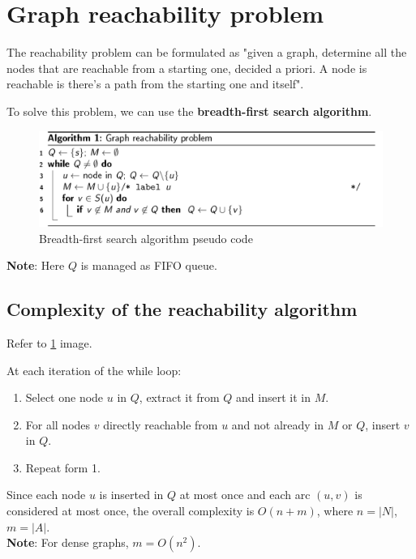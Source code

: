     \section{Graph reachability problem}
        The reachability problem can be formulated as "given a graph, determine all the nodes that are reachable from a starting one, decided a priori. A node is reachable is there's a path from the starting one and itself".
        
        To solve this problem, we can use the \textbf{breadth-first search algorithm}. 
        \begin{figure}[H]
        	\centering
        	\includegraphics[width = \textwidth]{./images/breadth-first-search.png}
            \caption{Breadth-first search algorithm pseudo code}
            \label{fig:breadthFirstSearchPseudoCode}
        \end{figure}
        \textbf{Note}: Here $Q$ is managed as FIFO queue.
        \subsection{Complexity of the reachability algorithm}
            Refer to \ref{fig:breadthFirstSearchPseudoCode} image.
            
            At each iteration of the while loop:
            \begin{enumerate}
                \item Select one node $u$ in $Q$, extract it from $Q$ and insert it in $M$.
                \item For all nodes $v$ directly reachable from $u$ and not already in $M$ or $Q$, insert $v$ in $Q$.
                \item Repeat form 1.
            \end{enumerate}
            
            Since each node $u$ is inserted in $Q$ at most once and each arc $(u, v)$ is considered at most once, the overall complexity is
            $O(n + m)$, where $n = |N|$, $m = |A|$.\\
            \textbf{Note}: For dense graphs, $m = O(n^2)$.
